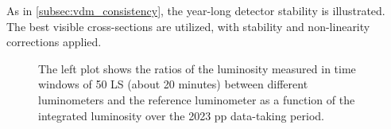 
As in \autoref{subsec:vdm_consistency}, the year-long detector stability is illustrated. The best visible cross-sections are utilized, with stability and non-linearity corrections applied.

\begin{figure}[!htb]
    \centering
    \caption{The left plot shows the ratios of the luminosity measured in time windows of 50 LS (about 20 minutes) between different luminometers and the reference luminometer as a function of the integrated luminosity over the 2023 pp data-taking period.}
    \label{fig:final_preliminary_year_stability}
\end{figure}

